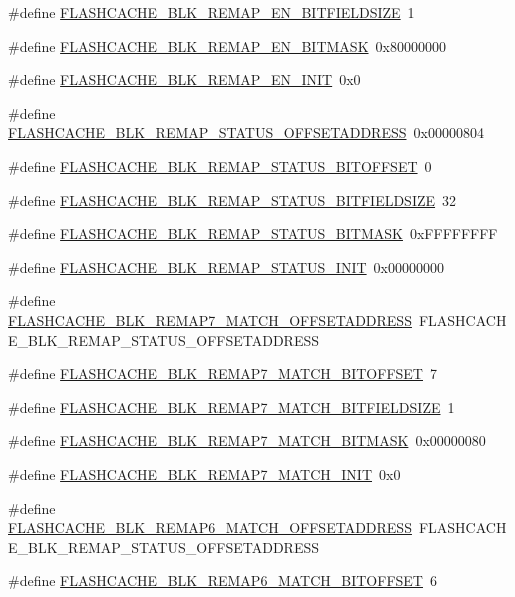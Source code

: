 \begin{DoxyCompactItemize}
\item 
\#define \hyperlink{a00550_aa645424ebe0d2404b8df2ad3e4584267}{FLASHCACHE\_\-BLK\_\-REMAP\_\-EN\_\-BITFIELDSIZE}~1
\item 
\#define \hyperlink{a00550_af0b159bc1170700c87a0c334638b0d4e}{FLASHCACHE\_\-BLK\_\-REMAP\_\-EN\_\-BITMASK}~0x80000000
\item 
\#define \hyperlink{a00550_a71dbe03a634f90e4bbefbecaedc37e3e}{FLASHCACHE\_\-BLK\_\-REMAP\_\-EN\_\-INIT}~0x0
\item 
\#define \hyperlink{a00550_af13f8f9559e743a368271ef727bbbd42}{FLASHCACHE\_\-BLK\_\-REMAP\_\-STATUS\_\-OFFSETADDRESS}~0x00000804
\item 
\#define \hyperlink{a00550_ac0e9d2763e2bfe7397c1c7fedfe87dc4}{FLASHCACHE\_\-BLK\_\-REMAP\_\-STATUS\_\-BITOFFSET}~0
\item 
\#define \hyperlink{a00550_adbc701d766ac93dd87fd0f076a1d7dcf}{FLASHCACHE\_\-BLK\_\-REMAP\_\-STATUS\_\-BITFIELDSIZE}~32
\item 
\#define \hyperlink{a00550_a9f9f4d9bccf6d743cae007cb5e56a048}{FLASHCACHE\_\-BLK\_\-REMAP\_\-STATUS\_\-BITMASK}~0xFFFFFFFF
\item 
\#define \hyperlink{a00550_a68ff9d44bb4a6aeff05814d3efc83855}{FLASHCACHE\_\-BLK\_\-REMAP\_\-STATUS\_\-INIT}~0x00000000
\item 
\#define \hyperlink{a00550_a6da17dacb533d6e150365e17e32ccbe6}{FLASHCACHE\_\-BLK\_\-REMAP7\_\-MATCH\_\-OFFSETADDRESS}~FLASHCACHE\_\-BLK\_\-REMAP\_\-STATUS\_\-OFFSETADDRESS
\item 
\#define \hyperlink{a00550_adaba202711fa60f8680388c576111ed1}{FLASHCACHE\_\-BLK\_\-REMAP7\_\-MATCH\_\-BITOFFSET}~7
\item 
\#define \hyperlink{a00550_af46bf0b637ed1029cbe9d0c664afaf34}{FLASHCACHE\_\-BLK\_\-REMAP7\_\-MATCH\_\-BITFIELDSIZE}~1
\item 
\#define \hyperlink{a00550_a6685dfb4a7a2f2700963ce0fc47415b8}{FLASHCACHE\_\-BLK\_\-REMAP7\_\-MATCH\_\-BITMASK}~0x00000080
\item 
\#define \hyperlink{a00550_a35da2e64e1b87b030b68621eaae96b18}{FLASHCACHE\_\-BLK\_\-REMAP7\_\-MATCH\_\-INIT}~0x0
\item 
\#define \hyperlink{a00550_ad047328b257a6bc59b9c1f8b339f53de}{FLASHCACHE\_\-BLK\_\-REMAP6\_\-MATCH\_\-OFFSETADDRESS}~FLASHCACHE\_\-BLK\_\-REMAP\_\-STATUS\_\-OFFSETADDRESS
\item 
\#define \hyperlink{a00550_a5e4dfc3bb80bc57ef90429b41c9e7164}{FLASHCACHE\_\-BLK\_\-REMAP6\_\-MATCH\_\-BITOFFSET}~6
\item 

\end{DoxyCompactItemize}
